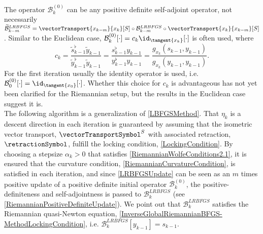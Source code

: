 The operator $\mathcal{B}^{(0)}_k$ can be any positive definite self-adjoint operator, not necessarily $\widetilde{\mathcal{B}}^{LRBFGS}_{k-m} = \vectorTransport{x_{k-m}}{x_k}[S] \circ \mathcal{B}^{LRBFGS}_{k-m} \circ \vectorTransport{x_k}{x_{k-m}}[S]$. Similar to the Euclidean case, $\mathcal{B}^{(0)}_k[\cdot] = c_k \id_{\tangent{x_k}}[\cdot]$ is often used, where
\begin{equation}\label{RiemannianLBFGSinitialMatrixNorm}
    c_k = \frac{\widetilde{s}^{\flat}_{k-1} \widetilde{y}_{k-1}}{\widetilde{y}^{\flat}_{k-1} \widetilde{y}_{k-1}} = \frac{s^{\flat}_{k-1} y_{k-1}}{y^{\flat}_{k-1} y_{k-1}} = \frac{g_{x_k}(s_{k-1}, y_{k-1})}{g_{x_k}(y_{k-1}, y_{k-1})}.
\end{equation}
For the first iteration usually the identity operator is used, i.e. $\mathcal{B}^{(0)}_0[\cdot] = \id_{\tangent{x_0}}[\cdot]$. Whether this choice for $c_k$ is advantageous has not yet been clarified for the Riemannian setup, but the results in the Euclidean case suggest it is. \\
The following algorithm is a generalization of \cref{LBFGSMethod}. That $\eta_k$ is a descent direction in each iteration is guaranteed by assuming that the isometric vector transport, $\vectorTransportSymbol^S$ with associated retraction, $\retractionSymbol$, fulfill the locking condition, \cref{LockingCondition}. By choosing a stepsize $\alpha_k > 0$ that satisfies \cref{RiemannianWolfeConditions2.1}, it is ensured that the curvature condition, \cref{RiemannianCurvatureCondition}, is satisfied in each iteration, and since \cref{LRBFGSUpdate} can be seen as an $m$ times positive update of a positive definite initial operator $\mathcal{B}^{(0)}_k$, the positive-definiteness and self-adjointness is passed to $\mathcal{B}^{LRBFGS}_k$ (see \cref{RiemannianPositiveDefiniteUpdate}). We point out that $\mathcal{B}^{LRBFGS}_k$ satisfies the Riemannian quasi-Newton equation, \cref{InverseGlobalRiemannianBFGS-MethodLockingCondition}, i.e. $\mathcal{B}^{LRBFGS}_k [y_{k-1}] = s_{k-1}$.

